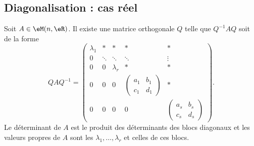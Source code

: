 \subsection{Diagonalisation : cas réel}

\begin{lemma}  \label{LemSchureRelnrqfiy}
    Soit \( A\in\eM(n,\eR)\). Il existe une matrice orthogonale \( Q\) telle que \( Q^{-1}AQ\) soit de la forme
    \begin{equation}        \label{EqMtrTSqRTA}
        QAQ^{-1}=\begin{pmatrix}
            \lambda_1    &   *    &   *    &   *    &   *\\  
            0    &   \ddots    &   \ddots    &   \ddots    &   \vdots\\  
            0    &   0    &   \lambda_r    &   *    &   *\\  
            0    &   0    &   0    &   \begin{pmatrix}
                a_1    &   b_1    \\ 
                c_1    &   d_1    
            \end{pmatrix}&   *\\  
            0    &   0    &  0     &   0    &   \begin{pmatrix}
                a_s    &   b_s    \\ 
                c_s    &   d_s    
            \end{pmatrix}
        \end{pmatrix}.
    \end{equation}
    Le déterminant de \( A\) est le produit des déterminants des blocs diagonaux et les valeurs propres de \( A\) sont les \( \lambda_1,\ldots, \lambda_r\) et celles de ces blocs.
\end{lemma}

